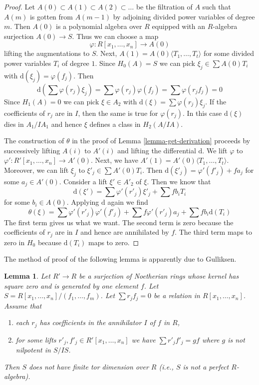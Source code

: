 \documentclass{stacks-project}
\theoremstyle{plain}
\newtheorem{lemma}[subsection]{Lemma}
\theoremstyle{definition}
\theoremstyle{remark}
\numberwithin{equation}{subsection}
\begin{document}
\begin{proof}
Let $A(0) \subset A(1) \subset A(2) \subset \ldots$ be the filtration
of $A$ such that $A(m)$ is gotten from $A(m - 1)$ by adjoining divided
power variables of degree $m$. Then $A(0)$ is a polynomial algebra
over $R$ equipped with an $R$-algebra surjection $A(0) \to S$.
Thus we can choose a map
$$
\varphi : R[x_1, \ldots, x_n] \to A(0)
$$
lifting the augmentations to $S$.
Next, $A(1) = A(0)\langle T_1, \ldots, T_t \rangle$ for some divided
power variables $T_i$ of degree $1$. Since $H_0(A) = S$ we
can pick $\xi_j \in \sum A(0)T_i$ with $\text{d}(\xi_j) = \varphi(f_j)$.
Then
$$
\text{d}\left(\sum \varphi(r_j) \xi_j\right) =
\sum  \varphi(r_j) \varphi(f_j) =  \sum \varphi(r_jf_j) = 0
$$
Since $H_1(A) = 0$ we can pick $\xi \in A_2$ with
$\text{d}(\xi) = \sum \varphi(r_j) \xi_j$.
If the coefficients of $r_j$ are in $I$, then the same
is true for $\varphi(r_j)$. In this case
$\text{d}(\xi)$ dies in $A_1/IA_1$ and
hence $\xi$ defines a class in $H_2(A/IA)$.

\medskip\noindent
The construction of $\theta$ in the proof of Lemma \ref{lemma-get-derivation}
proceeds by successively lifting $A(i)$ to $A'(i)$ and lifting the
differential $\text{d}$. We lift $\varphi$
to $\varphi' : R'[x_1, \ldots, x_n] \to A'(0)$.
Next, we have $A'(1) = A'(0)\langle T_1, \ldots, T_t\rangle$.
Moreover, we can lift $\xi_j$ to $\xi'_j \in \sum A'(0)T_i$.
Then $\text{d}(\xi'_j) = \varphi'(f'_j) + f a_j$ for some
$a_j \in A'(0)$.
Consider a lift $\xi' \in A'_2$ of $\xi$.
Then we know that
$$
\text{d}(\xi') = \sum \varphi'(r'_j)\xi'_j + \sum fb_iT_i
$$
for some $b_i \in A(0)$. Applying $\text{d}$ again we find
$$
\theta(\xi) = \sum \varphi'(r'_j)\varphi'(f'_j) +
\sum f \varphi'(r'_j) a_j + \sum fb_i \text{d}(T_i)
$$
The first term gives us what we want. The second term is zero
because the coefficients of $r_j$ are in $I$ and hence are
annihilated by $f$. The third term maps to zero in $H_0$
because $\text{d}(T_i)$ maps to zero.
\end{proof}

\noindent
The method of proof of the following lemma is apparently due to Gulliksen.

\begin{lemma}
\label{lemma-not-finite-pd}
Let $R' \to R$ be a surjection of Noetherian rings whose kernel has square
zero and is generated by one element $f$. Let
$S = R[x_1, \ldots, x_n]/(f_1, \ldots, f_m)$.
Let $\sum r_j f_j = 0$ be a relation in $R[x_1, \ldots, x_n]$.
Assume that
\begin{enumerate}
\item each $r_j$ has coefficients in the annihilator $I$ of $f$ in $R$,
\item for some lifts $r'_j, f'_j \in R'[x_1, \ldots, x_n]$ we have
$\sum r'_j f'_j = gf$ where $g$ is not nilpotent in $S/IS$.
\end{enumerate}
Then $S$ does not have finite tor dimension over $R$ (i.e., $S$ is not
a perfect $R$-algebra).
\end{lemma}
\end{document}
